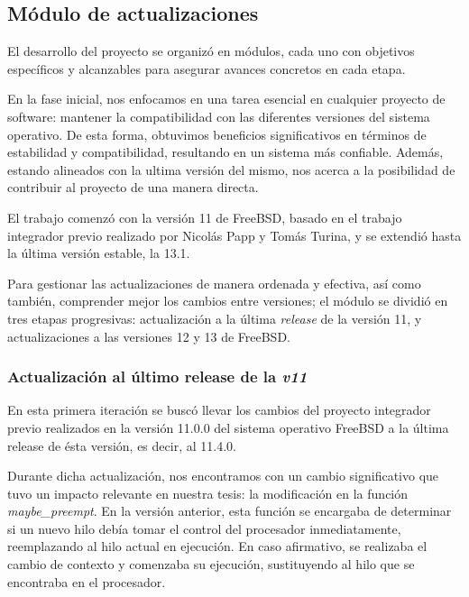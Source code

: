 \subsection{Módulo de actualizaciones}

El desarrollo del proyecto se organizó en módulos, cada uno con objetivos específicos y alcanzables para asegurar avances concretos en cada etapa.\par

En la fase inicial, nos enfocamos en una tarea esencial en cualquier proyecto de software: mantener la compatibilidad con las diferentes versiones del sistema operativo. De esta forma, obtuvimos beneficios significativos en términos de estabilidad y compatibilidad, resultando en un sistema más confiable. Además, estando alineados con la ultima versión del mismo, nos acerca a la posibilidad de contribuir al proyecto de una manera directa.\par

El trabajo comenzó con la versión 11 de FreeBSD, basado en el trabajo integrador previo realizado por Nicolás Papp y Tomás Turina, y se extendió hasta la última versión estable, la 13.1.\par

Para gestionar las actualizaciones de manera ordenada y efectiva, así como también, comprender mejor los cambios entre versiones; el módulo se dividió en tres etapas progresivas: actualización a la última \textit{release} de la versión 11, y actualizaciones a las versiones 12 y 13 de FreeBSD.\par


\subsubsection{Actualización al último release de la \textit{v11}}

En esta primera iteración se buscó llevar los cambios del proyecto integrador previo realizados en la versión 11.0.0 del sistema operativo FreeBSD a la última release de ésta versión, es decir, al 11.4.0.\par

Durante dicha actualización, nos encontramos con un cambio significativo que tuvo un impacto relevante en nuestra tesis: la modificación en la función \textit{maybe\_preempt}. En la versión anterior, esta función se encargaba de determinar si un nuevo hilo debía tomar el control del procesador inmediatamente, reemplazando al hilo actual en ejecución. En caso afirmativo, se realizaba el cambio de contexto y comenzaba su ejecución, sustituyendo al hilo que se encontraba en el procesador.\par

